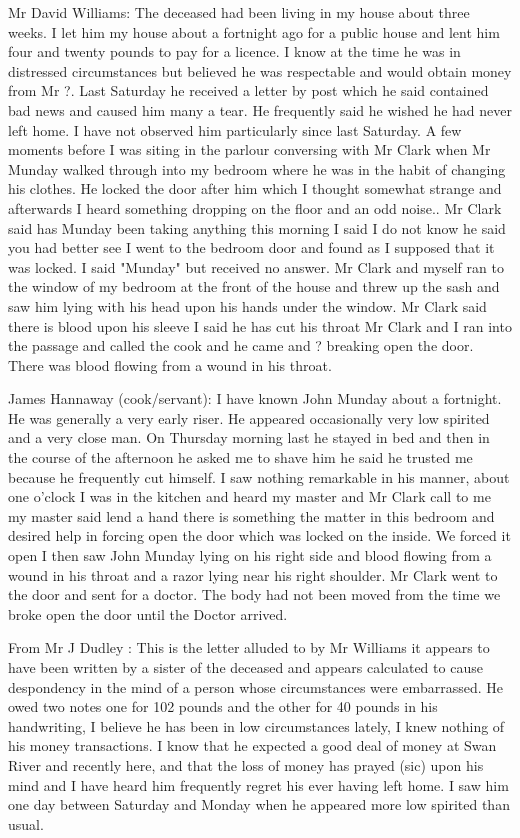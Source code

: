 Mr David Williams: The deceased had been living in my house about three weeks. I let him my house about a fortnight ago for a public house and lent him four and twenty pounds to pay for a licence. I know at the time he was in distressed circumstances but believed he was respectable and would obtain money from Mr ?. Last Saturday he received a letter by post which he said contained bad news and caused him many a tear. He frequently said he wished he had never left home. I have not observed him particularly since last Saturday. A few moments before I was siting in the parlour conversing with Mr Clark when Mr Munday walked through into my bedroom where he was in the habit of changing his clothes. He locked the door after him which I thought somewhat strange and afterwards I heard something dropping on the floor and an odd noise.. Mr Clark said has Munday been taking anything this morning I said I do not know he said you had better see I went to the bedroom door and found as I supposed that it was locked. I said "Munday" but received no answer. Mr Clark and myself ran to the window of my bedroom at the front of the house and threw up the sash and saw him lying with his head upon his hands under the window. Mr Clark said there is blood upon his sleeve I said he has cut his throat Mr Clark and I ran into the passage and called the cook and he came and ? breaking open the door. There was blood flowing from a wound in his throat.

James Hannaway (cook/servant): I have known John Munday about a fortnight. He was generally a very early riser. He appeared occasionally very low spirited and a very close man. On Thursday morning last he stayed in bed and then in the course of the afternoon he asked me to shave him he said he trusted me because he frequently cut himself. I saw nothing remarkable in his manner, about one o'clock I was in the kitchen and heard my master and Mr Clark call to me my master said lend a hand there is something the matter in this bedroom and desired help in forcing open the door which was locked on the inside. We forced it open I then saw John Munday lying on his right side and blood flowing from a wound in his throat and a razor lying near his right shoulder. Mr Clark went to the door and sent for a doctor. The body had not been moved from the time we broke open the door until the Doctor arrived.

From Mr J Dudley : This is the letter alluded to by Mr Williams it appears to have been written by a sister of the deceased and appears calculated to cause despondency in the mind of a person whose circumstances were embarrassed. He owed two notes one for 102 pounds and the other for 40 pounds in his handwriting, I believe he has been in low circumstances lately, I knew nothing of his money transactions. I know that he expected a good deal of money at Swan River and recently here, and that the loss of money has prayed (sic) upon his mind and I have heard him frequently regret his ever having left home. I saw him one day between Saturday and Monday when he appeared more low spirited than usual.

